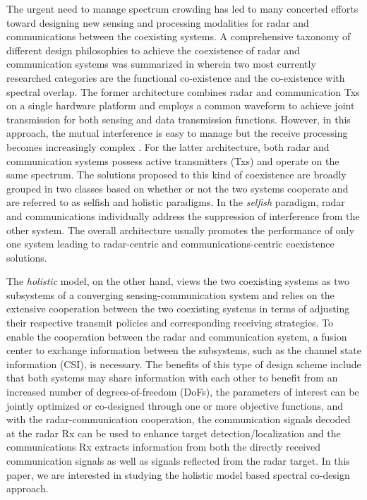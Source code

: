 \documentclass[9pt,journal]{IEEEtran}
\begin{document}
The urgent need to manage spectrum crowding has led to many concerted efforts toward designing new sensing and processing modalities for radar and communications between the coexisting systems\cite{mishra2019toward,chiriyath2017radar}. %
A comprehensive taxonomy of different design philosophies to achieve the coexistence of radar and communication systems was summarized in %
wherein two most currently researched categories are the functional co-existence and the co-existence with spectral overlap. The former architecture combines radar and communication Txs on a single hardware platform and employs a common waveform to achieve joint transmission for both sensing and data transmission functions\cite{liu2018mu,liu2018toward,duggal2019doppler}. However, in this approach, the mutual interference is easy to manage but the receive processing becomes increasingly complex \cite{dokhanchi2019mmwave}. For the latter architecture, both radar and communication systems possess active transmitters (Txs) and operate on the same spectrum. The solutions proposed to this kind of coexistence are broadly grouped in two classes based on whether or not the two systems cooperate and are referred to as selfish and holistic paradigms. In the \textit{selfish} paradigm, radar and communications individually address the suppression of interference from the other system. The overall architecture usually promotes the performance of only one system leading to radar-centric \cite{alaee2019discrete,bao2019precoding,slavik2019cognitive} and communications-centric \cite{ayyar2019robust} coexistence solutions. 

The \textit{holistic} model, on the other hand, views the two coexisting systems as two subsystems of a converging sensing-communication system and relies on the extensive cooperation between the two coexisting systems in terms of adjusting their respective transmit policies and corresponding receiving strategies\cite{mahal2017spectral,MCMIMO_RadComm,qian2018joint,rihan2018optimum,2019arXiv190707943G,biswas2018fdqos,he2019performance}. To enable the cooperation between the radar and communication system, a fusion center to exchange information between the subsystems, such as the channel state information (CSI), is necessary\cite{MCMIMO_RadComm,he2019performance}.
The benefits of this type of design scheme include that both systems may share information with each other to benefit from an increased number of degrees-of-freedom (DoFs), the parameters of interest can be jointly optimized or co-designed through one \cite{MCMIMO_RadComm,qian2018joint} or more \cite{biswas2018fdqos,dokhanchi2020multi} objective functions, and with the radar-communication cooperation, the communication signals decoded at the radar Rx can be used to enhance target detection/localization\cite{biswas2018fdqos,he2019performance} and the communications Rx extracts information from both the directly received communication signals as well as signals reflected from the radar target\cite{liu2018mimo}. In this paper, we are interested in studying the holistic model based spectral co-design approach. 
\end{document}
